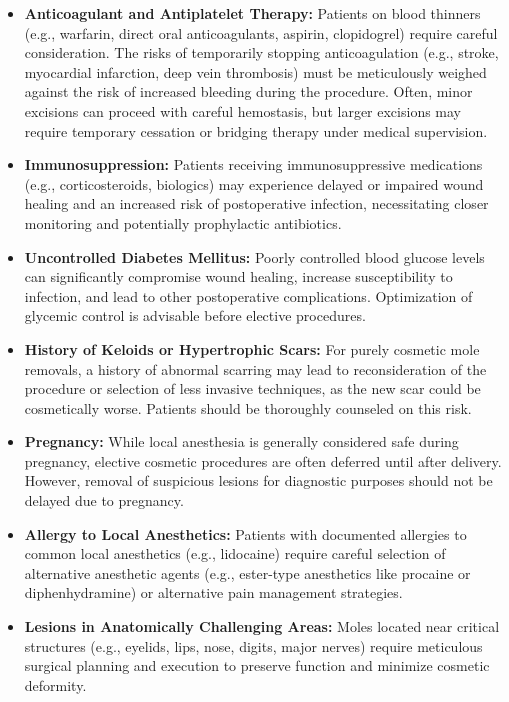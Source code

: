 \begin{itemize}
  \item \textbf{Anticoagulant and Antiplatelet Therapy:} Patients on blood thinners (e.g., warfarin, direct oral anticoagulants, aspirin, clopidogrel) require careful consideration. The risks of temporarily stopping anticoagulation (e.g., stroke, myocardial infarction, deep vein thrombosis) must be meticulously weighed against the risk of increased bleeding during the procedure. Often, minor excisions can proceed with careful hemostasis, but larger excisions may require temporary cessation or bridging therapy under medical supervision.
  
  \item \textbf{Immunosuppression:} Patients receiving immunosuppressive medications (e.g., corticosteroids, biologics) may experience delayed or impaired wound healing and an increased risk of postoperative infection, necessitating closer monitoring and potentially prophylactic antibiotics.
  
  \item \textbf{Uncontrolled Diabetes Mellitus:} Poorly controlled blood glucose levels can significantly compromise wound healing, increase susceptibility to infection, and lead to other postoperative complications. Optimization of glycemic control is advisable before elective procedures.
  
  \item \textbf{History of Keloids or Hypertrophic Scars:} For purely cosmetic mole removals, a history of abnormal scarring may lead to reconsideration of the procedure or selection of less invasive techniques, as the new scar could be cosmetically worse. Patients should be thoroughly counseled on this risk.
  
  \item \textbf{Pregnancy:} While local anesthesia is generally considered safe during pregnancy, elective cosmetic procedures are often deferred until after delivery. However, removal of suspicious lesions for diagnostic purposes should not be delayed due to pregnancy.
  
  \item \textbf{Allergy to Local Anesthetics:} Patients with documented allergies to common local anesthetics (e.g., lidocaine) require careful selection of alternative anesthetic agents (e.g., ester-type anesthetics like procaine or diphenhydramine) or alternative pain management strategies.
  
  \item \textbf{Lesions in Anatomically Challenging Areas:} Moles located near critical structures (e.g., eyelids, lips, nose, digits, major nerves) require meticulous surgical planning and execution to preserve function and minimize cosmetic deformity.
\end{itemize}

